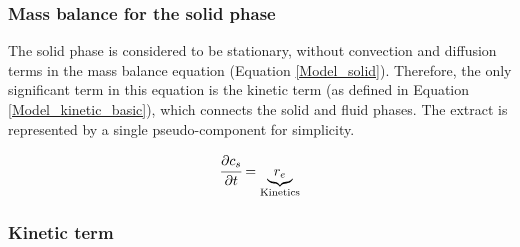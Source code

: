 \documentclass[../Article_Model_Parameters.tex]{subfiles}
\begin{document}
	\subsubsection{Mass balance for the solid phase} \label{Mass_balance_solid}
	
	The solid phase is considered to be stationary, without convection and diffusion terms in the mass balance equation (Equation \ref{Model_solid}). Therefore, the only significant term in this equation is the kinetic term (as defined in Equation \ref{Model_kinetic_basic}), which connects the solid and fluid phases. The extract is represented by a single pseudo-component for simplicity. 
	
	{\footnotesize
		\begin{equation} 
			\label{Model_solid}
					\cfrac{\partial c_s}{\partial t} = \underbrace{ r_e }_{\text{Kinetics}}
			\end{equation} }
			
	\subsubsection{Kinetic term} \label{CH: Kinetic}
	
	
	
\end{document}
